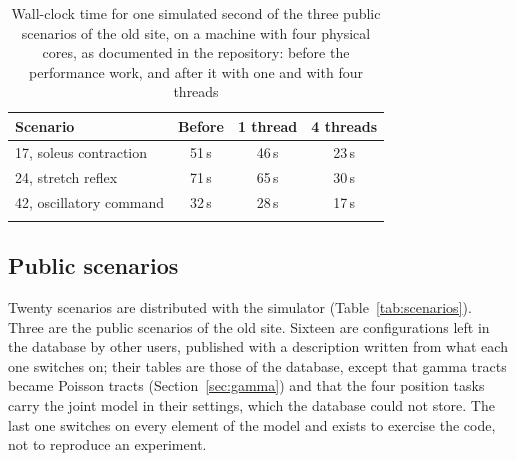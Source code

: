 \documentclass[pdflatex,sn-apa,iicol]{sn-jnl}
\begin{document}
\begin{table}[t]
\caption{Wall-clock time for one simulated second of the three public scenarios of the old site, on a machine with four physical cores, as documented in the repository: before the performance work, and after it with one and with four threads}\label{tab:performance}
\begin{tabular}{@{}lccc@{}}
\toprule
Scenario & Before & 1 thread & 4 threads \\
\midrule
17, soleus contraction & 51\,s & 46\,s & 23\,s \\
24, stretch reflex & 71\,s & 65\,s & 30\,s \\
42, oscillatory command & 32\,s & 28\,s & 17\,s \\
\botrule
\end{tabular}
\end{table}

\subsection{Public scenarios}\label{sec:scenarios}

Twenty scenarios are distributed with the simulator (Table~\ref{tab:scenarios}). Three are the public scenarios of the old site. Sixteen are configurations left in the database by other users, published with a description written from what each one switches on; their tables are those of the database, except that gamma tracts became Poisson tracts (Section~\ref{sec:gamma}) and that the four position tasks carry the joint model in their settings, which the database could not store. The last one switches on every element of the model and exists to exercise the code, not to reproduce an experiment.
\end{document}
